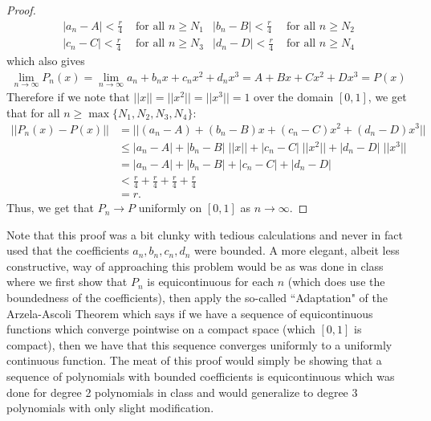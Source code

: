 \documentclass[10pt,a4paper]{article}
\theoremstyle{definition}
\theoremstyle{definition}
\numberwithin{equation}{section}
\begin{document}
\begin{proof}
\begin{align*}
|a_n - A| < \frac{r}{4} &\text{ for all } n \geq N_1 & |b_n - B| < \frac{r}{4} &\text{ for all } n \geq N_2\\
|c_n - C| < \frac{r}{4} &\text{ for all } n \geq N_3 & |d_n - D| < \frac{r}{4} &\text{ for all } n \geq N_4
\end{align*}
which also gives
\begin{align*}
\lim_{n \to \infty} P_n(x) = \lim_{n \to \infty} a_n + b_n x + c_n x^2 + d_n x^3 = A + Bx + Cx^2 + Dx^3 = P(x)
\end{align*}
Therefore if we note that $||x|| = ||x^2|| = ||x^3|| = 1$ over the domain $[0, 1]$, we get that for all $n \geq \max\{N_1, N_2, N_3, N_4\}$:
\begin{align*}
||P_n(x) - P(x)|| &= ||(a_n - A) + (b_n - B)x + (c_n -  C)x^2 + (d_n - D)x^3||\\
&\leq |a_n - A| + |b_n - B| \; ||x|| + |c_n - C| \; ||x^2|| + |d_n - D| \; ||x^3||\\
&= |a_n - A| + |b_n - B| + |c_n - C| + |d_n - D|\\
&< \frac{r}{4} + \frac{r}{4} + \frac{r}{4} + \frac{r}{4}\\
&= r.
\end{align*}
Thus, we get that $P_n \to P$ uniformly on $[0, 1]$ as $n \to \infty$. 
\end{proof} 

Note that this proof was a bit clunky with tedious calculations and never in fact used that the coefficients $a_n, b_n, c_n, d_n$ were bounded. A more elegant, albeit less constructive, way of approaching this problem would be as was done in class where we first show that $P_n$ is equicontinuous for each $n$ (which does use the boundedness of the coefficients), then apply the so-called ``Adaptation" of the Arzela-Ascoli Theorem which says if we have a sequence of equicontinuous functions which converge pointwise on a compact space (which $[0, 1]$ is compact), then we have that this sequence converges uniformly to a uniformly continuous function. The meat of this proof would simply be showing that a sequence of polynomials with bounded coefficients is equicontinuous which was done for degree 2 polynomials in class and would generalize to degree 3 polynomials with only slight modification. 
\end{document}
